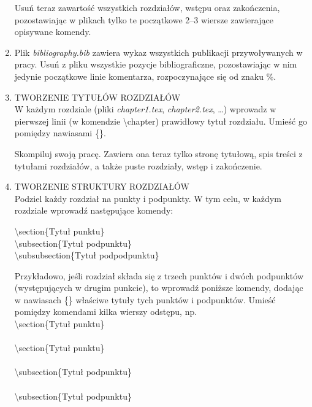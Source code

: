 \begin{enumerate}
	Usuń teraz zawartość wszystkich rozdziałów, wstępu oraz zakończenia, pozostawiając w plikach tylko te początkowe 2--3 wiersze zawierające opisywane komendy.
	
	\item Plik \textit{bibliography.bib} zawiera wykaz wszystkich publikacji przywoływanych w pracy. Usuń z pliku wszystkie pozycje bibliograficzne, pozostawiając w nim jedynie początkowe linie komentarza, rozpoczynające się od znaku \%.
	
	\item TWORZENIE TYTUŁÓW ROZDZIAŁÓW\\
	W każdym rozdziale (pliki \textit{chapter1.tex}, \textit{chapter2.tex}, \ldots) wprowadz w pierwszej linii (w komendzie \textbackslash chapter) prawidłowy tytuł rozdziału. Umieść go pomiędzy nawiasami \{\}.
	
	Skompiluj swoją pracę. Zawiera ona teraz tylko stronę tytułową, spis treści z tytułami rozdziałów, a także puste rozdziały, wstęp i zakończenie.
		
	\item TWORZENIE STRUKTURY ROZDZIAŁÓW\\
	Podziel każdy rozdział na punkty i podpunkty. W tym celu, w każdym rozdziale wprowadź następujące komendy:
	
	\textbackslash section\{Tytuł punktu\}\\
	\textbackslash subsection\{Tytuł podpunktu\}\\
	\textbackslash subsubsection\{Tytuł podpodpunktu\}
	
	Przykładowo, jeśli rozdział składa się z trzech punktów i dwóch podpunktów (występujących w drugim punkcie), to wprowadź poniższe komendy, dodając w nawiasach \{\} właściwe tytuły tych punktów i podpunktów. Umieść pomiędzy komendami kilka wierszy odstępu, np.\\
	
	\textbackslash section\{Tytuł punktu\}\\\\

	\textbackslash section\{Tytuł punktu\}\\\\

	\textbackslash subsection\{Tytuł podpunktu\}\\\\

	\textbackslash subsection\{Tytuł podpunktu\}\\\\


\end{enumerate}
